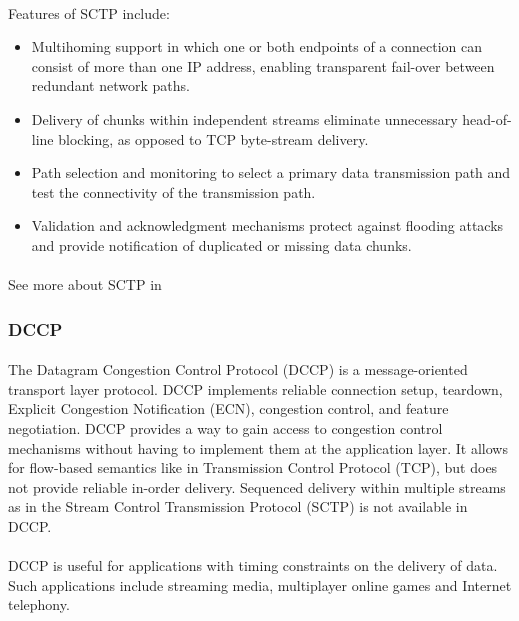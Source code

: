 \paragraph{}
Features of SCTP include:
\begin{itemize}
\item Multihoming support in which one or both endpoints of a connection can consist of more than one IP address, enabling transparent fail-over between redundant network paths.
\item Delivery of chunks within independent streams eliminate unnecessary head-of-line blocking, as opposed to TCP byte-stream delivery.
\item Path selection and monitoring to select a primary data transmission path and test the connectivity of the transmission path.
\item Validation and acknowledgment mechanisms protect against flooding attacks and provide notification of duplicated or missing data chunks.
\end{itemize}
\paragraph{}
See more about SCTP in \cite{SCTP}

\subsubsection{DCCP}
\paragraph{}
The Datagram Congestion Control Protocol (DCCP) is a message-oriented transport layer protocol. DCCP implements reliable connection setup, teardown, Explicit Congestion Notification (ECN), congestion control, and feature negotiation. DCCP provides a way to gain access to congestion control mechanisms without having to implement them at the application layer. It allows for flow-based semantics like in Transmission Control Protocol (TCP), but does not provide reliable in-order delivery. Sequenced delivery within multiple streams as in the Stream Control Transmission Protocol (SCTP) is not available in DCCP.
\paragraph{}
DCCP is useful for applications with timing constraints on the delivery of data. Such applications include streaming media, multiplayer online games and Internet telephony.
